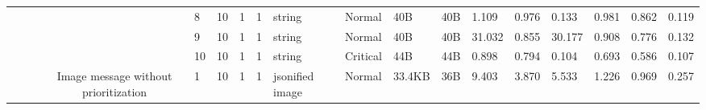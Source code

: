 \begin{landscape}
\begin{table}[]
{\begin{tabular}{@{}ccccllllllllllllll@{}}
                                                                                   &                              &                                &                                                                                                          & 8                                                     & 10                                       & 1                                          & 1                                 & string                           & Normal                             & 40B                                           & 40B                                             & 1.109                   & 0.976    & 0.133                        & 0.981                   & 0.862    & 0.119                        \\
                                                                                   &                              &                                &                                                                                                          & 9                                                     & 10                                       & 1                                          & 1                                 & string                           & Normal                             & 40B                                           & 40B                                             & 31.032                  & 0.855    & 30.177                       & 0.908                   & 0.776    & 0.132                        \\
                                                                                   &                              &                                &                                                                                                          & 10                                                    & 10                                       & 1                                          & 1                                 & string                           & Critical                           & 44B                                           & 44B                                             & 0.898                   & 0.794    & 0.104                        & 0.693                   & 0.586    & 0.107                        \\
                                                                                   &                              &                                & \multirow{10}{*}{Image message without prioritization}                                                   & 1                                                     & 10                                       & 1                                          & 1                                 & jsonified image                  & Normal                             & 33.4KB                                        & 36B                                             & 9.403                   & 3.870    & 5.533                        & 1.226                   & 0.969    & 0.257                        \\

\end{tabular}}
\end{table}
\end{landscape}
